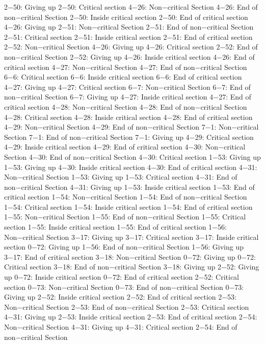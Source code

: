 2−50: Giving up
2−50: Critical section
4−26: Non−critical Section
4−26: End of non−critical Section
2−50: Inside critical section
2−50: End of critical section
4−26: Giving up
2−51: Non−critical Section
2−51: End of non−critical Section
2−51: Critical section
2−51: Inside critical section
2−51: End of critical section
2−52: Non−critical Section
4−26: Giving up
4−26: Critical section
2−52: End of non−critical Section
2−52: Giving up
4−26: Inside critical section
4−26: End of critical section
4−27: Non−critical Section
4−27: End of non−critical Section
6−6: Critical section
6−6: Inside critical section
6−6: End of critical section
4−27: Giving up
4−27: Critical section
6−7: Non−critical Section
6−7: End of non−critical Section
6−7: Giving up
4−27: Inside critical section
4−27: End of critical section
4−28: Non−critical Section
4−28: End of non−critical Section
4−28: Critical section
4−28: Inside critical section
4−28: End of critical section
4−29: Non−critical Section
4−29: End of non−critical Section
7−1: Non−critical Section
7−1: End of non−critical Section
7−1: Giving up
4−29: Critical section
4−29: Inside critical section
4−29: End of critical section
4−30: Non−critical Section
4−30: End of non−critical Section
4−30: Critical section
1−53: Giving up
1−53: Giving up
4−30: Inside critical section
4−30: End of critical section
4−31: Non−critical Section
1−53: Giving up
1−53: Critical section
4−31: End of non−critical Section
4−31: Giving up
1−53: Inside critical section
1−53: End of critical section
1−54: Non−critical Section
1−54: End of non−critical Section
1−54: Critical section
1−54: Inside critical section
1−54: End of critical section
1−55: Non−critical Section
1−55: End of non−critical Section
1−55: Critical section
1−55: Inside critical section
1−55: End of critical section
1−56: Non−critical Section
3−17: Giving up
3−17: Critical section
3−17: Inside critical section
0−72: Giving up
1−56: End of non−critical Section
1−56: Giving up
3−17: End of critical section
3−18: Non−critical Section
0−72: Giving up
0−72: Critical section
3−18: End of non−critical Section
3−18: Giving up
2−52: Giving up
0−72: Inside critical section
0−72: End of critical section
2−52: Critical section
0−73: Non−critical Section
0−73: End of non−critical Section
0−73: Giving up
2−52: Inside critical section
2−52: End of critical section
2−53: Non−critical Section
2−53: End of non−critical Section
2−53: Critical section
4−31: Giving up
2−53: Inside critical section
2−53: End of critical section
2−54: Non−critical Section
4−31: Giving up
4−31: Critical section
2−54: End of non−critical Section
